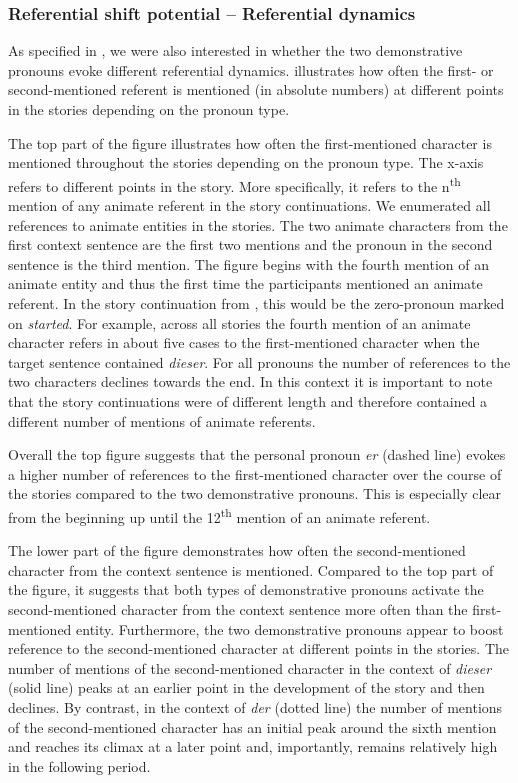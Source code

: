 \documentclass[output=paper,colorlinks,citecolor=brown]{langscibook}
\begin{document}
\subsubsection{Referential shift potential – Referential dynamics}\label{sec:fuchs:2.5.3}

As specified in , we were also interested in whether the two demonstrative pronouns evoke different referential dynamics.  illustrates how often the first- or second-mentioned referent is mentioned (in absolute numbers) at different points in the stories depending on the pronoun type. 

The top part of the figure illustrates how often the first-mentioned character is mentioned throughout the stories depending on the pronoun type. The x-axis refers to different points in the story. More specifically, it refers to the n\textsuperscript{th} mention of any animate referent in the story continuations. We enumerated all references to animate entities in the stories. The two animate characters from the first context sentence are the first two mentions and the pronoun in the second sentence is the third mention. The figure begins with the fourth mention of an animate entity and thus the first time the participants mentioned an animate referent. In the story continuation from , this would be the zero-pronoun marked on \textit{started}. For example, across all stories the fourth mention of an animate character refers in about five cases to the first-mentioned character when the target sentence contained \textit{dieser}. For all pronouns the number of references to the two characters declines towards the end. In this context it is important to note that the story continuations were of different length and therefore contained a different number of mentions of animate referents.   

Overall the top figure suggests that the personal pronoun \textit{er} (dashed line) evokes a higher number of references to the first-mentioned character over the course of the stories compared to the two demonstrative pronouns. This is especially clear from the beginning up until the 12\textsuperscript{th} mention of an animate referent. 

The lower part of the figure demonstrates how often the second-mentioned character from the context sentence is mentioned. Compared to the top part of the figure, it suggests that both types of demonstrative pronouns activate the second-mentioned character from the context sentence more often than the first-mentioned entity. Furthermore, the two demonstrative pronouns appear to boost reference to the second-mentioned character at different points in the stories. The number of mentions of the second-mentioned character in the context of \textit{dieser} (solid line) peaks at an earlier point in the development of the story and then declines. By contrast, in the context of \textit{der} (dotted line) the number of mentions of the second-mentioned character has an initial peak around the sixth mention and reaches its climax at a later point and, importantly, remains relatively high in the following period. 
\end{document}
